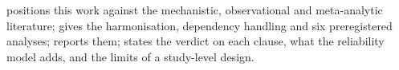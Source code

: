  positions this work against the mechanistic, observational and
meta-analytic literature;  gives the harmonisation, dependency handling and
six preregistered analyses;  reports them;  states
the verdict on each clause, what the reliability model adds, and the limits of a study-level
design.
